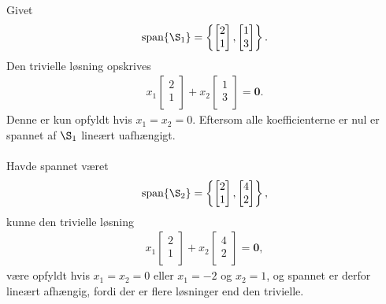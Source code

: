 \begin{eks}\label{fisk}
Givet
\begin{align*}
\text{span}\{\S_1 \} =
\left\{ 
\begin{bmatrix}
           2 \\
           1 \\
\end{bmatrix} 
,
\begin{bmatrix}
           1 \\
           3 \\
\end{bmatrix}
\right\}.
\end{align*}
Den trivielle løsning opskrives 
%
\begin{align*}
x_1 
\begin{bmatrix}
           2 \\
           1 \\
\end{bmatrix} 
+ x_2
\begin{bmatrix}
           1 \\
           3 \\
\end{bmatrix}
= \mathbf{0}.
\end{align*}
%
Denne er kun opfyldt hvis $x_1=x_2=0$. 
Eftersom alle koefficienterne er nul er spannet af $\S_1$ lineært uafhængigt.
\\\\
Havde spannet været 
\begin{align*}
\text{span}\{\S_2 \} =
\left\{ 
\begin{bmatrix}
           2 \\
           1 \\
\end{bmatrix} 
,
\begin{bmatrix}
           4 \\
           2 \\
\end{bmatrix}
\right\},
\end{align*}
%
kunne den trivielle løsning 
%
\begin{align*}
x_1 
\begin{bmatrix}
           2 \\
           1 \\
\end{bmatrix} 
+ x_2
\begin{bmatrix}
           4 \\
           2 \\
\end{bmatrix}
= \mathbf{0},
\end{align*}
%
være opfyldt hvis $x_1=x_2=0$ eller $x_1=-2$ og $x_2=1$, og spannet er derfor lineært afhængig, fordi der er flere løsninger end den trivielle.
%
\end{eks}
